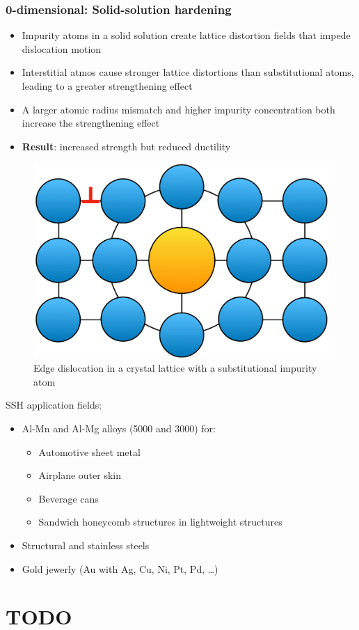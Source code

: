 \documentclass{article}
\begin{document}
\subsubsection{0-dimensional: Solid-solution hardening}
\begin{itemize}
  \item Impurity atoms in a solid solution create lattice distortion fields that impede dislocation motion
  \item Interstitial atmos cause stronger lattice distortions than substitutional atoms, leading to a greater strengthening effect
  \item A larger atomic radius mismatch and higher impurity concentration both increase the strengthening effect
  \item \textbf{Result}: increased strength but reduced ductility
\end{itemize}

\begin{figure}[ht!]
  \centering
  \includegraphics[width=.4\textwidth]{media/0d_strength.png}
  \caption*{Edge dislocation in a crystal lattice with a substitutional impurity atom}
\end{figure}

\newpage
SSH application fields:
\begin{itemize}
  \item Al-Mn and Al-Mg alloys (5000 and 3000) for:
  \begin{itemize}
    \item Automotive sheet metal
    \item Airplane outer skin
    \item Beverage cans
    \item Sandwich honeycomb structures in lightweight structures
  \end{itemize}
  \item Structural and stainless steels
  \item Gold jewerly (Au with Ag, Cu, Ni, Pt, Pd, \dots)
\end{itemize}

\section{TODO}
\end{document}
